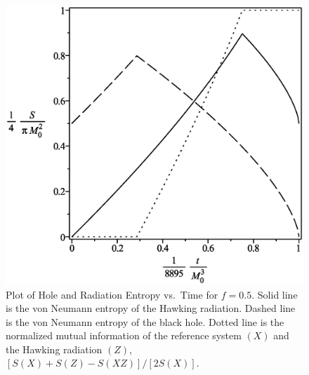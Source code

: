 \documentclass[12pt]{article}
\begin{document}
\begin{figure}[H]
\centering
\includegraphics[width=1\textwidth]{Hawking-hole-radiation-mutual-entropy-vs-time-graph-10f-is-5.eps}
\caption{Plot of Hole and Radiation Entropy vs.\ Time for $f=0.5$.
Solid line is the von Neumann entropy of the Hawking radiation.
Dashed line is the von Neumann entropy of the black hole.
Dotted line is the normalized mutual information of the reference system $(X)$ and the Hawking radiation $(Z)$, $[S(X)+S(Z)-S(XZ)]/[2S(X)]$.}
\end{figure}
\end{document}
